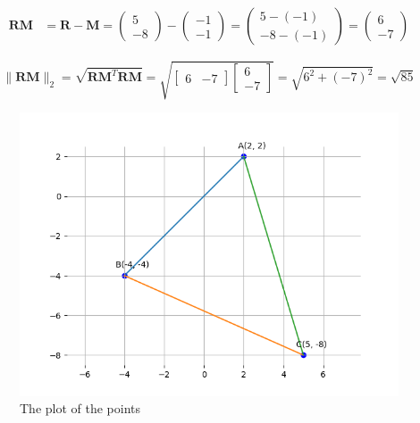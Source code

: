 \documentclass[journal]{IEEEtran}
\numberwithin{equation}{enumi}
\numberwithin{figure}{enumi}
\begin{document}
\begin{align}
	\mathbf{RM} &= \mathbf{R} - \mathbf{M} = \begin{pmatrix} 5 \\ -8 \end{pmatrix} - \begin{pmatrix} -1 \\ -1 \end{pmatrix} = \begin{pmatrix} 5 - (-1) \\ -8 - (-1) \end{pmatrix} = \begin{pmatrix} 6 \\ -7 \end{pmatrix}
\end{align}





\[
\| \mathbf{RM} \|_2 = \sqrt{\mathbf{RM}^T \mathbf{RM}} = \sqrt{\begin{bmatrix} 6 & -7 \end{bmatrix} \begin{bmatrix} 6 \\ -7 \end{bmatrix}} = \sqrt{6^2 + (-7)^2} = \sqrt{85}
\]





\begin{figure}[h!]
  \hspace{-1cm}
  \includegraphics[width=1.2\textwidth]{Figure_1.png}
  
  \caption{The plot of the points }
  \label{fig:your_label}
\end{figure}
\end{document}
